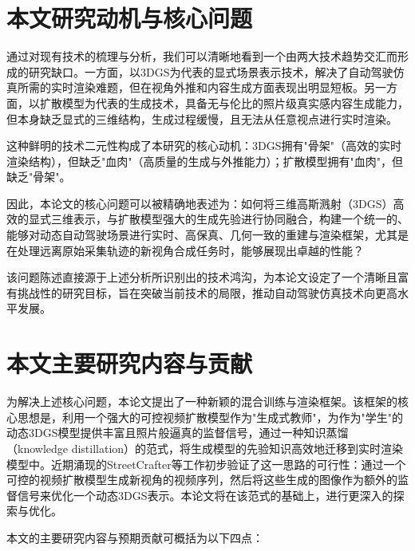 \section{本文研究动机与核心问题}

通过对现有技术的梳理与分析，我们可以清晰地看到一个由两大技术趋势交汇而形成的研究缺口。一方面，以3DGS为代表的显式场景表示技术，解决了自动驾驶仿真所需的实时渲染难题，但在视角外推和内容生成方面表现出明显短板\cite{yan2024street}。另一方面，以扩散模型为代表的生成技术，具备无与伦比的照片级真实感内容生成能力，但本身缺乏显式的三维结构，生成过程缓慢，且无法从任意视点进行实时渲染\cite{yan2024street}。

这种鲜明的技术二元性构成了本研究的核心动机：3DGS拥有"骨架"（高效的实时渲染结构），但缺乏"血肉"（高质量的生成与外推能力）；扩散模型拥有"血肉"，但缺乏"骨架"。

因此，本论文的核心问题可以被精确地表述为：如何将三维高斯溅射（3DGS）高效的显式三维表示，与扩散模型强大的生成先验进行协同融合，构建一个统一的、能够对动态自动驾驶场景进行实时、高保真、几何一致的重建与渲染框架，尤其是在处理远离原始采集轨迹的新视角合成任务时，能够展现出卓越的性能？

该问题陈述直接源于上述分析所识别出的技术鸿沟，为本论文设定了一个清晰且富有挑战性的研究目标，旨在突破当前技术的局限，推动自动驾驶仿真技术向更高水平发展。

\section{本文主要研究内容与贡献}

为解决上述核心问题，本论文提出了一种新颖的混合训练与渲染框架。该框架的核心思想是，利用一个强大的可控视频扩散模型作为"生成式教师"，为作为"学生"的动态3DGS模型提供丰富且照片般逼真的监督信号，通过一种知识蒸馏（knowledge distillation）的范式，将生成模型的先验知识高效地迁移到实时渲染模型中。近期涌现的StreetCrafter等工作初步验证了这一思路的可行性：通过一个可控的视频扩散模型生成新视角的视频序列，然后将这些生成的图像作为额外的监督信号来优化一个动态3DGS表示\cite{yan2024street}。本论文将在该范式的基础上，进行更深入的探索与优化。

本文的主要研究内容与预期贡献可概括为以下四点：

